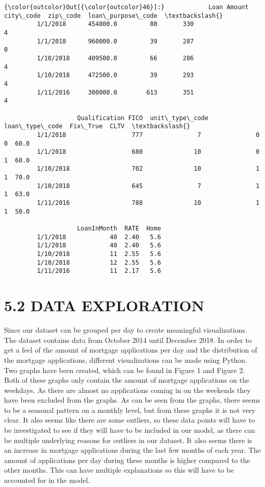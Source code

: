 \documentclass[11pt]{article}
\begin{document}
\begin{Verbatim}[commandchars=\\\{\}]
{\color{outcolor}Out[{\color{outcolor}46}]:}            Loan Amount  city\_code  zip\_code  loan\_purpose\_code  \textbackslash{}
         1/1/2018      454800.0         80       330                  4   
         1/1/2018      960000.0         39       287                  0   
         1/10/2018     409500.0         66       286                  4   
         1/10/2018     472500.0         39       293                  4   
         1/11/2016     300000.0        613       351                  4   
         
                    Qualification FICO  unit\_type\_code  loan\_type\_code  Fix\_True  CLTV  \textbackslash{}
         1/1/2018                  777               7               0         0  60.0   
         1/1/2018                  680              10               0         1  60.0   
         1/10/2018                 702              10               1         1  70.0   
         1/10/2018                 645               7               1         1  63.0   
         1/11/2016                 788              10               1         1  50.0   
         
                    LoanInMonth  RATE  Home  
         1/1/2018            40  2.40   5.6  
         1/1/2018            40  2.40   5.6  
         1/10/2018           11  2.55   5.6  
         1/10/2018           12  2.55   5.6  
         1/11/2016           11  2.17   5.6  
\end{Verbatim}
            
    \section{5.2 DATA EXPLORATION}\label{data-exploration}

Since our dataset can be grouped per day to create meaningful
visualizations. The dataset contains data from October 2014 until
December 2018. In order to get a feel of the amount of mortgage
applications per day and the distribution of the mortgage applications,
different visualizations can be made using Python. Two graphs have been
created, which can be found in Figure 1 and Figure 2. Both of these
graphs only contain the amount of mortgage applications on the weekdays.
As there are almost no applications coming in on the weekends they have
been excluded from the graphs. As can be seen from the graphs, there
seems to be a seasonal pattern on a monthly level, but from these graphs
it is not very clear. It also seems like there are some outliers, so
these data points will have to be investigated to see if they will have
to be included in our model, as there can be multiple underlying reasons
for outliers in our dataset. It also seems there is an increase in
mortgage applications during the last few months of each year. The
amount of applications per day during these months is higher compared to
the other months. This can have multiple explanations so this will have
to be accounted for in the model.
\end{document}
